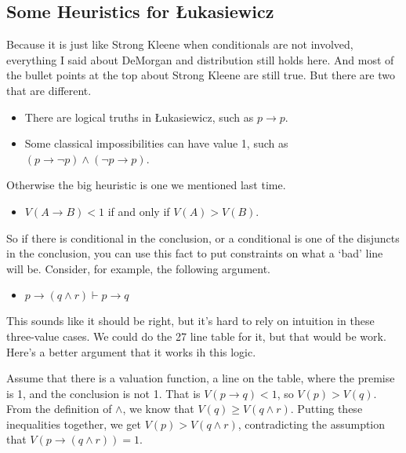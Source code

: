 \documentclass[
]{article}
\providecommand{\tightlist}{%
  \setlength{\itemsep}{0pt}\setlength{\parskip}{0pt}}\usepackage{longtable,booktabs,array}
\begin{document}
\hypertarget{some-heuristics-for-ux142ukasiewicz}{%
\subsection{Some Heuristics for
Łukasiewicz}\label{some-heuristics-for-ux142ukasiewicz}}

Because it is just like Strong Kleene when conditionals are not
involved, everything I said about DeMorgan and distribution still holds
here. And most of the bullet points at the top about Strong Kleene are
still true. But there are two that are different.

\begin{itemize}
\tightlist
\item
  There are logical truths in Łukasiewicz, such as \(p \rightarrow p\).
\item
  Some classical impossibilities can have value 1, such as
  \((p \rightarrow \neg p) \wedge (\neg p \rightarrow p)\).
\end{itemize}

Otherwise the big heuristic is one we mentioned last time.

\begin{itemize}
\tightlist
\item
  \(V(A \rightarrow B) < 1\) if and only if \(V(A) > V(B)\).
\end{itemize}

So if there is conditional in the conclusion, or a conditional is one of
the disjuncts in the conclusion, you can use this fact to put
constraints on what a `bad' line will be. Consider, for example, the
following argument.

\begin{itemize}
\tightlist
\item
  \(p \rightarrow (q \wedge r) \vdash p \rightarrow q\)
\end{itemize}

This sounds like it should be right, but it's hard to rely on intuition
in these three-value cases. We could do the 27 line table for it, but
that would be work. Here's a better argument that it works ih this
logic.

Assume that there is a valuation function, a line on the table, where
the premise is 1, and the conclusion is not 1. That is
\(V(p \rightarrow q) < 1\), so \(V(p) > V(q)\). From the definition of
\(\wedge\), we know that \(V(q) \geq V(q \wedge r)\). Putting these
inequalities together, we get \(V(p) > V(q \wedge r)\), contradicting
the assumption that \(V(p \rightarrow (q \wedge r)) = 1\).
\end{document}
